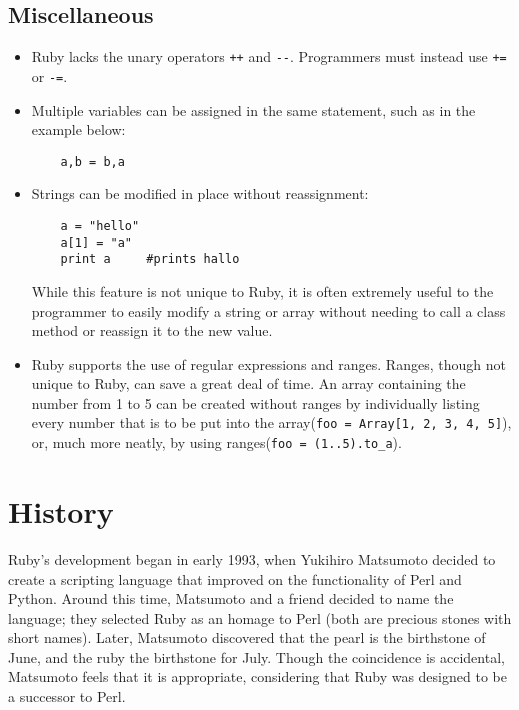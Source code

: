 \documentclass[12pt]{article}
\begin{document}
\subsection{Miscellaneous}
\begin{itemize}
    \item {Ruby lacks the unary operators \verb|++| and \verb|--|. Programmers must instead use \verb|+=| or \verb|-=|\cite{rubymisc}.}
    \item {Multiple variables can be assigned in the same statement, such as in the example below:
    \begin{lstlisting} 
    a,b = b,a
    \end{lstlisting}}
    \item{Strings can be modified in place without reassignment: 
    \begin{lstlisting}
    a = "hello"
    a[1] = "a"
    print a     #prints hallo
    \end{lstlisting}
    While this feature is not unique to Ruby, it is often extremely useful to the programmer to easily modify a string or array without needing to call a class method or reassign it to the new value.}
    \item{Ruby supports the use of regular expressions and ranges. Ranges, though not unique to Ruby, can save a great deal of time. An array containing the number from 1 to 5 can be created without ranges by individually listing every number that is to be put into the array(\verb|foo = Array[1, 2, 3, 4, 5]|), or, much more neatly, by using ranges(\verb|foo = (1..5).to_a|)\cite{rangetut}.}
    
\end{itemize}





\section{History}
Ruby's development began in early 1993, when Yukihiro Matsumoto decided to create a scripting language that improved on the functionality of Perl and Python\cite{rubyinterview}. 
Around this time, Matsumoto and a friend decided to name the language; they selected Ruby as an homage to Perl (both are precious stones with short names)\cite{rubyinterview}. Later, Matsumoto discovered that the pearl is the birthstone of June, and the ruby the birthstone for July. Though the coincidence is accidental, Matsumoto feels that it is appropriate, considering that Ruby was designed to be a successor to Perl.
\end{document}
